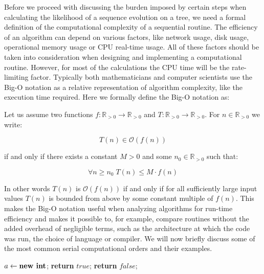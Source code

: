 Before we proceed with discussing the burden imposed by certain steps when calculating the likelihood of a sequence evolution on a tree, we need a formal definition of the computational complexity of a sequential routine.
The efficiency of an algorithm can depend on various factors, like network usage, disk usage, operational memory usage or CPU real-time usage.
All of these factors should be taken into consideration when designing and implementing a computational routine. 
However, for most of the calculations the CPU time will be the rate-limiting factor.
Typically both mathematicians and computer scientists use the Big-O notation as a relative representation of algorithm complexity, like the execution time required.
Here we formally define the Big-O notation as:

\begin{definition}
Let us assume two functions $f:\mathbb{R}_{>0}\rightarrow\mathbb{R}_{>0}$ and $T:\mathbb{R}_{>0}\rightarrow\mathbb{R}_{>0}$. 
For $n \in \mathbb{R}_{>0}$ we write:

\begin{equation}
T(n) \in \mathcal{O}\left(f(n)\right)
\label{eq:bigOh}
\end{equation}

\noindent
if and only if there exists a constant $M>0$ and some $n_0 \in \mathbb{R}_{>0}$ such that:

\begin{equation}
\forall n\geq n_{0}\;T(n)\leq M \cdot f(n)
\end{equation}
\end{definition}


In other words $T(n)$ is $\mathcal{O}\left(f(n)\right)$ if and only if for all sufficiently large input values $T(n)$ is bounded from above by some constant multiple of $f(n)$.
This makes the Big-O notation useful when analyzing algorithms for run-time efficiency and makes it possible to, for example, compare routines without the added overhead of negligible terms, such as the architecture at which the code was run, the choice of language or compiler.
We will now briefly discuss some of the most common serial computational orders and their examples. 

\begin{algorithm}[h!]
\centering
\begin{algorithmic}[1]
\State $a \gets \text{\textbf{new int}}$;
%
%
\State \textbf{return} $true$;
%
\Else 
%
\State \textbf{return} $false$;
%
\EndIf
\end{algorithmic}
\caption{
{ \footnotesize 
{\bf Single test operation.} 
} %
}
\label{alg:o1}
\end{algorithm}

